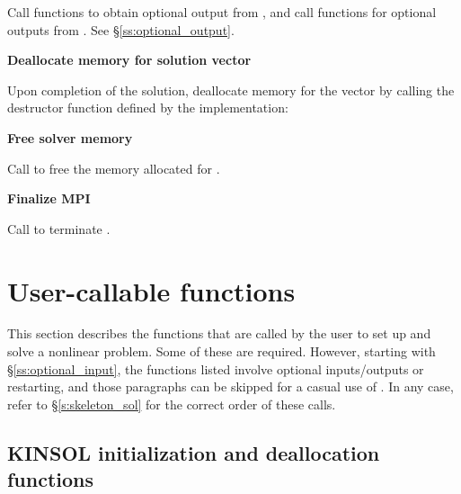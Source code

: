 \begin{Steps}
  Call  functions to obtain optional output from {\kinsol},
  and call  functions for optional outputs from {\kinspgmr}.
  See \S\ref{ss:optional_output}.

\item
  {\bf Deallocate memory for solution vector}

  Upon completion of the solution, deallocate memory for the vector 
  by calling the destructor function defined by the {\nvector} implementation:

  {\s} 

  {\p} 
  
\item
  {\bf Free solver memory}

  Call  to free the memory allocated for {\kinsol}.
  
\item 
  {\bf {\p} Finalize MPI}

  Call  to terminate {\mpi}.
  
\end{Steps}


\section{User-callable functions}\label{s:kinsol_fct_sol}

This section describes the {\kinsol} functions that are called by the
user to set up and solve a nonlinear problem. Some of these are required. However,
starting with \S\ref{ss:optional_input}, the functions listed involve
optional inputs/outputs or restarting, and those paragraphs can be
skipped for a casual use of {\kinsol}. In any case, refer to
\S\ref{s:skeleton_sol} for the correct order of these calls.


\subsection{KINSOL initialization and deallocation functions}\label{ss:kinmalloc}

